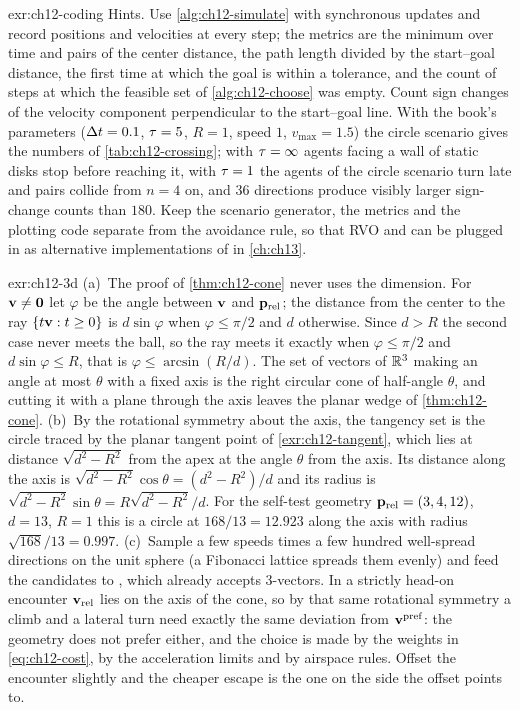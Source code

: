 \begin{solution}{exr:ch12-coding}
Hints. Use \cref{alg:ch12-simulate} with synchronous updates and record positions and velocities at every step; the metrics are the minimum over time and pairs of the center distance, the path length divided by the start--goal distance, the first time at which the goal is within a tolerance, and the count of steps at which the feasible set of \cref{alg:ch12-choose} was empty. Count sign changes of the velocity component perpendicular to the start--goal line. With the book's parameters ($\Delta t=0.1$, $\tau=5$, $R=1$, speed $1$, $v_{\max}=1.5$) the circle scenario gives the numbers of \cref{tab:ch12-crossing}; with $\tau=\infty$ agents facing a wall of static disks stop before reaching it, with $\tau=1$ the agents of the circle scenario turn late and pairs collide from $n=4$ on, and $36$ directions produce visibly larger sign-change counts than $180$. Keep the scenario generator, the metrics and the plotting code separate from the avoidance rule, so that RVO and \orca can be plugged in as alternative implementations of  in \cref{ch:ch13}.
\end{solution}
\begin{solution}{exr:ch12-3d}
(a)~The proof of \cref{thm:ch12-cone} never uses the dimension. For
$\mathbf{v}\ne\mathbf{0}$ let $\varphi$ be the angle between $\mathbf{v}$ and
$\mathbf{p}_{\mathrm{rel}}$; the distance from the center to the ray
$\left\{ t\mathbf{v} : t\ge0 \right\}$ is $d\sin\varphi$ when $\varphi\le\pi/2$ and $d$
otherwise. Since $d>R$ the second case never meets the ball, so the ray meets
it exactly when $\varphi\le\pi/2$ and $d\sin\varphi\le R$, that is
$\varphi\le\arcsin(R/d)$. The set of vectors of $\mathbb{R}^3$ making an angle at most
$\theta$ with a fixed axis is the right circular cone of half-angle $\theta$,
and cutting it with a plane through the axis leaves the planar wedge of
\cref{thm:ch12-cone}. (b)~By the rotational symmetry about the axis, the
tangency set is the circle traced by the planar tangent point of
\cref{exr:ch12-tangent}, which lies at distance $\sqrt{d^2-R^2}$ from the apex
at the angle $\theta$ from the axis. Its distance along the axis is
$\sqrt{d^2-R^2}\cos\theta=(d^2-R^2)/d$ and its radius is
$\sqrt{d^2-R^2}\sin\theta=R\sqrt{d^2-R^2}/d$. For the self-test geometry
$\mathbf{p}_{\mathrm{rel}}=(3,4,12)$, $d=13$, $R=1$ this is a circle at
$168/13=12.923$ along the axis with radius $\sqrt{168}/13=0.997$. (c)~Sample a
few speeds times a few hundred well-spread directions on the unit sphere (a
Fibonacci lattice spreads them evenly) and feed the candidates to
, which already accepts 3-vectors. In a strictly
head-on encounter $\mathbf{v}_{\mathrm{rel}}$ lies on the axis of the cone, so by
that same rotational symmetry a climb and a lateral turn need exactly the same
deviation from $\mathbf{v}^{\mathrm{pref}}$: the geometry does not prefer either,
and the choice is made by the weights in \cref{eq:ch12-cost}, by the
acceleration limits and by airspace rules. Offset the encounter slightly and
the cheaper escape is the one on the side the offset points to.
\end{solution}
